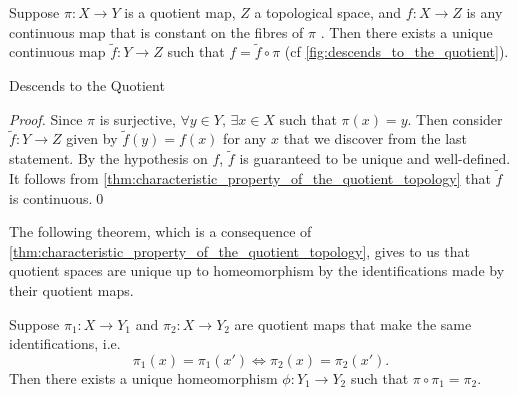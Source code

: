 \documentclass[notoc,notitlepage]{tufte-book}
\begin{document}

\begin{thm}\label{thm:descends_to_the_quotient}
  Suppose $\pi : X \to Y$ is a quotient map, $Z$ a topological space, and $f : X \to Z$ is any
  continuous map that is constant on the fibres of $\pi$ . Then there exists a unique continuous map $\tilde{f} : Y
  \to Z$ such that $f = \tilde{f} \circ \pi$ (cf \cref{fig:descends_to_the_quotient}).
  \begin{marginfigure}
    \centering
    \caption{Descends to the Quotient}\label{fig:descends_to_the_quotient}
  \end{marginfigure}
\end{thm}

\begin{proof}
  Since $\pi$ is surjective, $\forall y \in Y, \, \exists x \in X$ such that $\pi(x) = y$. Then
  consider $\tilde{f} : Y \to Z$ given by $\tilde{f}(y) = f(x)$ for any $x$ that we discover from
  the last statement. By the hypothesis on $f$, $\tilde{f}$ is guaranteed to be unique and
  well-defined. It follows from \cref{thm:characteristic_property_of_the_quotient_topology} that
  $\tilde{f}$ is continuous.\qed\
\end{proof}

The following theorem, which is a consequence of
\cref{thm:characteristic_property_of_the_quotient_topology}, gives to us that quotient spaces are
unique up to homeomorphism by the identifications made by their quotient maps.

\begin{thm}\label{thm:uniqueness_of_quotient_spaces}
  Suppose $\pi_1 : X \to Y_1$ and $\pi_2 : X \to Y_2$ are quotient maps that make the same
  identifications, i.e.
  \begin{equation*}
    \pi_1(x) = \pi_1(x') \iff \pi_2(x) = \pi_2(x').
  \end{equation*}
  Then there exists a unique homeomorphism $\phi : Y_1 \to Y_2$ such that $\pi \circ \pi_1 =
  \pi_2$.
\end{thm}
\end{document}
